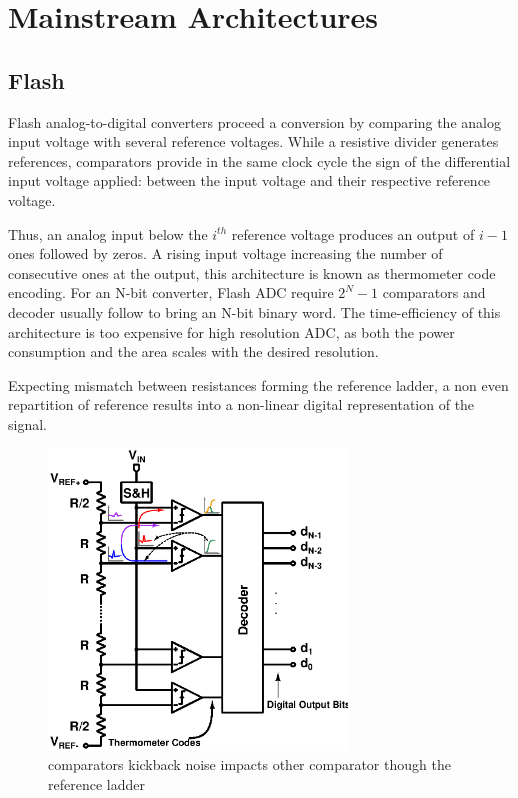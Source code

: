 \section{Mainstream Architectures}                 %
\label{sec:mainstream-adc}
	\subsection{Flash}                             %
	\label{sec:flash-adc}
Flash analog-to-digital converters proceed a conversion by comparing the analog input voltage with several reference voltages. While a resistive divider generates references, comparators provide in the same clock cycle the sign of the differential input voltage applied: between the input voltage and their respective reference voltage. %

Thus, an analog input below the \(i^{th} \) reference voltage produces an output of \(i-1 \) ones followed by zeros. A rising input voltage increasing the number of consecutive ones at the output, this architecture is known as thermometer code encoding. For an N-bit converter, Flash ADC require \(2^N-1\) comparators and decoder usually follow to bring an N-bit binary word. The time-efficiency of this architecture is too expensive for high resolution ADC, as both the power consumption and the area scales with the desired resolution.

Expecting mismatch between resistances forming the reference ladder, a non even repartition of reference results into a non-linear digital representation of the signal.

\begin{figure}[htp]
	\centering
	\includegraphics[height=8cm]{flash_adc.ps}
	\caption{comparators kickback noise impacts other comparator though the reference ladder}
	\label{fig:flash_kickback}
\end{figure}

